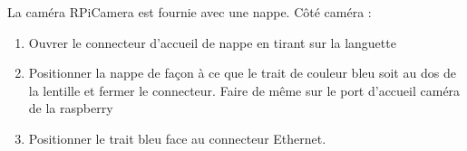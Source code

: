La caméra \gls{RPiCamera} est fournie avec une nappe. Côté caméra :

\begin{enumerate}
    \item Ouvrer le connecteur d'accueil de nappe en tirant sur la languette
    \item Positionner la nappe de façon à ce que le trait de couleur bleu soit au dos de la lentille et fermer le
          connecteur. Faire de même sur le port d'accueil caméra de la \gls{raspberry}
    \item Positionner le trait bleu face au connecteur Ethernet.
\end{enumerate}
